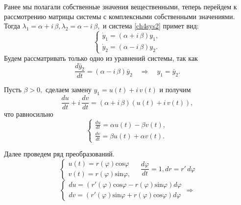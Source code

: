\begin{itemize}
Ранее мы полагали собственные значения вещественными, теперь перейдем к рассмотрению матрицы системы с комплексными собственными значениями. Тогда $\lambda_1 = \alpha + i \, \beta, \lambda_2 = \alpha - i \, \beta,$ и система \eqref{ch4sys2} примет вид:
$$
\begin{cases}
\dot y_1 = (\alpha + i \, \beta) y_1 , \\
\dot y_2= (\alpha - i \, \beta) y_2.
\end{cases}
$$
Будем рассматривать только одно из уравнений системы, так как
$$
\frac{ d \bar y_2}{dt} = (\alpha - i \, \beta) \bar y_2 \quad \Rightarrow \quad y_1 = \bar y_2.
$$

Пусть $\beta > 0, $ сделаем замену $y_1= u(t) + i\, v(t)$ и получим
$$
\frac{du}{dt} + i \, \frac{dv}{dt} = (\alpha + i \, \beta) ( u(t) + i\, v(t)),
$$
что равносильно
\begin{equation} \label{ch4sys4}
\begin{cases}
\frac{du}{dt} = \alpha u(t) -   \beta v(t) , \\
\frac{dv}{dt} = \beta u(t) + \alpha v(t).
\end{cases}
\end{equation}

Далее проведем ряд преобразований.
$$
\begin{cases}
u(t) = r(\varphi) \text{cos} \varphi  \\
v(t) = r(\varphi) \text{sin} \varphi, 
\end{cases}  \quad  \frac{d\varphi}{dt} = 1, dr = r' \, d \varphi
$$
$$
\begin{cases}
du = (r'(\varphi) \text{cos} \varphi - r(\varphi) \text{sin}\varphi) d\varphi \\
dv = (r'(\varphi) \text{sin} \varphi  + r(\varphi) \text{cos}\varphi) d\varphi
\end{cases} \Rightarrow
$$


\end{itemize}
